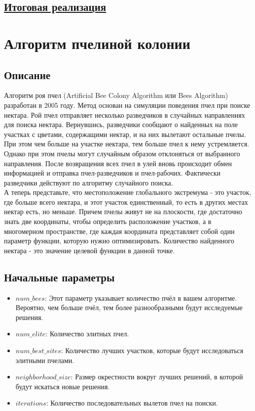 \documentclass{article}
\begin{document}
\subsection*{\href{https://gitfront.io/r/Vitaliy-X-0/TLNs9s2iAaGd/MetOpt/}{Итоговая реализация}}

\newpage
\section*{Алгоритм пчелиной колонии}
\subsection*{Описание}

Алгоритм роя пчел (Artificial Bee Colony Algorithm или Bees Algorithm) разработан в 2005 году. Метод основан на симуляции поведения пчел при поиске нектара.  Рой пчел отправляет несколько разведчиков в случайных направлениях для поиска нектара.  Вернувшись,  разведчики сообщают о найденных на поле участках с цветами,  содержащими нектар,  и на них вылетают остальные пчелы. При этом чем больше на участке нектара, тем больше пчел к нему устремляется.  Однако при этом пчелы могут случайным образом отклоняться от выбранного направления. После возвращения всех пчел в улей вновь происходит обмен информацией и отправка пчел-разведчиков и пчел-рабочих.  Фактически разведчики действуют по алгоритму случайного поиска. \\

\noindent А теперь представьте, что местоположение глобального экстремума - это участок, где больше всего нектара, и этот участок единственный, то есть в других местах нектар есть, но меньше. Причем пчелы живут не на плоскости, где достаточно знать две координаты, чтобы определить расположение участков, а в многомерном пространстве, где каждая координата представляет собой один параметр функции, которую нужно оптимизировать. Количество найденного нектара - это значение целевой функции в данной точке.

\subsection*{Начальные параметры}

\begin{itemize}
    \item $num\_bees$: Этот параметр указывает количество пчёл в вашем алгоритме. Вероятно, чем больше пчёл, тем более разнообразными будут исследуемые решения.
    \item $num\_elite$: Количество элитных пчел.
    \item $num\_best\_sites$: Количество лучших участков, которые будут исследоваться элитными пчелами.
    \item $neighborhood\_size$: Размер окрестности вокруг лучших решений, в которой будут искаться новые решения. 
    \item $iterations$: Количество последовательных вылетов пчел на поиски.
\end{itemize}
\end{document}
